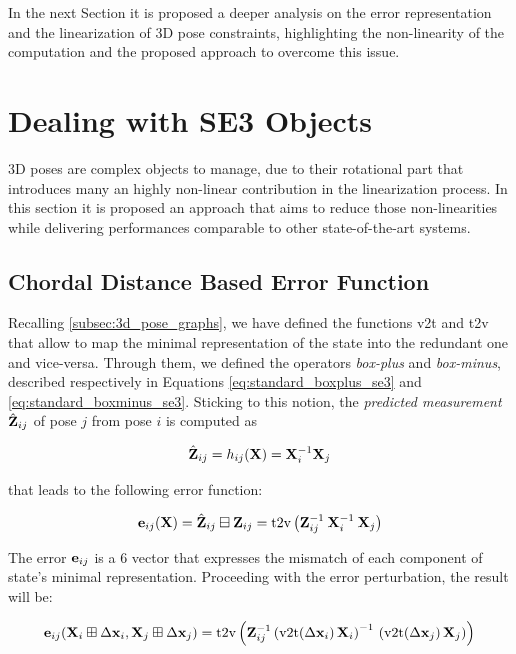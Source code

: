 In the next Section it is proposed a deeper analysis on the error representation and the linearization of 3D pose constraints, highlighting the non-linearity of the computation and the proposed approach to overcome this issue.

\section{Dealing with SE3 Objects}{\label{sec:se3_objects}}
3D poses are complex objects to manage, due to their rotational part that introduces many an highly non-linear contribution in the linearization process. In this section it is proposed an approach that aims to reduce those non-linearities while delivering performances comparable to other state-of-the-art systems.

\subsection{Chordal Distance Based Error Function}\label{subsec:chordal_dist_error}
Recalling \ref{subsec:3d_pose_graphs}, we have defined the functions v2t and t2v that allow to map the minimal representation of the state into the redundant one and vice-versa. Through them, we defined the operators \textit{box-plus} and \textit{box-minus}, described respectively in Equations \ref{eq:standard_boxplus_se3} and \ref{eq:standard_boxminus_se3}. Sticking to this notion, the \textit{predicted measurement} $\hat{\mathbf{Z}}_{ij}$ of pose $j$ from pose $i$ is computed as

\begin{equation}
    \label{eq:standard_prediction_se3}
    \hat{\mathbf{Z}}_{ij} = h_{ij}(\mathbf{X}) = \mathbf{X}_i^{-1}\mathbf{X}_j
\end{equation}

\noindent that leads to the following error function:

\begin{equation}
    \label{eq:standard_error_se3}
    \mathbf{e}_{ij}(\mathbf{X}) = \hat{\mathbf{Z}}_{ij} \boxminus \mathbf{Z}_{ij} = \text{t2v}\left(\mathbf{Z}_{ij}^{-1}\: \mathbf{X}_i^{-1} \: \mathbf{X}_j\right)
\end{equation}

\noindent The error $\mathbf{e}_{ij}$ is a 6 vector that expresses the mismatch of each component of state's minimal representation. Proceeding with the error perturbation, the result will be:

\begin{equation}
    \label{eq:standard_perturbated_error_se3}
    \error_{ij}(\SState_i \boxplus \dx_i, \SState_j \boxplus \dx_j) = \text{t2v}\left(\Meas_{ij}^{-1}\left(\v2t(\dx_i)\,\SState_i\right)^{-1} \, \left(\v2t(\dx_j)\,\SState_j\right)\right)
\end{equation}

